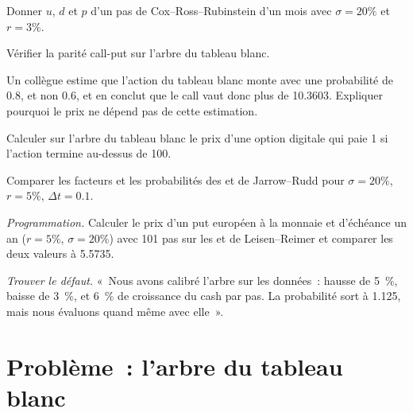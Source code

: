 \begin{exercise}[$\star$]\label{exo:dv:the-binomial-model:2}
Donner $u$, $d$ et $p$ d'un pas de Cox--Ross--Rubinstein d'un mois avec $\sigma=20\%$
et $r=3\%$.
\end{exercise}

\begin{exercise}[$\star$]\label{exo:dv:the-binomial-model:3}
Vérifier la parité call-put sur l'arbre du tableau blanc.
\end{exercise}

\begin{exercise}[$\star\star$]\label{exo:dv:the-binomial-model:4}
Un collègue estime que l'action du tableau blanc monte avec une probabilité de
0.8, et non 0.6, et en conclut que le call vaut donc plus de 10.3603. Expliquer pourquoi
le prix ne dépend pas de cette estimation.
\end{exercise}

\begin{exercise}[$\star\star$]\label{exo:dv:the-binomial-model:5}
Calculer sur l'arbre du tableau blanc le prix d'une option digitale qui paie 1 si l'action termine au-dessus de 100.
\end{exercise}

\begin{exercise}[$\star\star$]\label{exo:dv:the-binomial-model:6}
Comparer les facteurs et les probabilités des  et de Jarrow--Rudd pour
$\sigma=20\%$, $r=5\%$, $\Delta t=0.1$.
\end{exercise}

\begin{exercise}[$\star\star\star$]\label{exo:dv:the-binomial-model:7}
\emph{Programmation.} Calculer le prix d'un put européen à la monnaie et d'échéance un an ($r=5\%$,
$\sigma=20\%$) avec 101 pas sur les  et de Leisen--Reimer
et comparer les deux valeurs à 5.5735.
\end{exercise}

\begin{exercise}[$\star\star\star$]\label{exo:dv:the-binomial-model:8}
\emph{Trouver le défaut.} «~Nous avons calibré l'arbre sur les données~: hausse de 5~\%, baisse de 3~\%, et
6~\% de croissance du cash par pas. La probabilité sort à 1.125, mais nous évaluons
quand même avec elle~».
\end{exercise}

\section{Problème~: l'arbre du tableau blanc}

